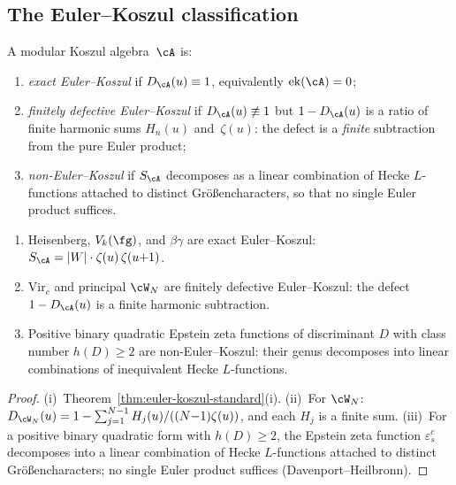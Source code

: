 \subsection{The Euler--Koszul classification}%
\label{subsec:euler-koszul-classification}%

\begin{definition}%
\label{def:euler-koszul-tier}%
%
A modular Koszul algebra~$\cA$ is:
\begin{enumerate}[label=\textup{(\roman*)}]
\item
\emph{exact Euler--Koszul} if $D_\cA(u) \equiv 1$, equivalently
$\operatorname{ek}(\cA) = 0$;
\item
\emph{finitely defective Euler--Koszul} if
$D_\cA(u) \not\equiv 1$ but $1 - D_\cA(u)$
is a ratio of finite harmonic sums $H_n(u)$ and~$\zeta(u)$:
the defect is a \emph{finite} subtraction from the
pure Euler product;
\item
\emph{non-Euler--Koszul} if $S_\cA$ decomposes as a linear
combination of Hecke $L$-functions attached to distinct
Gr\"o\ss encharacters, so that no single Euler product
suffices.
\end{enumerate}
\end{definition}

\begin{theorem}%
\label{thm:euler-koszul-tier-classification}%
%
\begin{enumerate}[label=\textup{(\roman*)}]
\item
Heisenberg, $V_k(\fg)$, and $\beta\gamma$ are exact
Euler--Koszul: $S_\cA = |W|\cdot\zeta(u)\,\zeta(u{+}1)$.
\item
$\mathrm{Vir}_c$ and principal $\cW_N$ are finitely defective
Euler--Koszul: the defect
$1 - D_\cA(u)$ is a finite harmonic subtraction.
\item
Positive binary quadratic Epstein zeta functions of discriminant
$D$ with class number $h(D) \geq 2$ are non-Euler--Koszul: their
genus decomposes into linear combinations of inequivalent Hecke
$L$-functions.
\end{enumerate}
\end{theorem}

\begin{proof}
(i)~Theorem~\ref{thm:euler-koszul-standard}(i).
(ii)~For $\cW_N$: $D_{\cW_N}(u) = 1 -
\sum_{j=1}^{N-1}H_j(u)/((N{-}1)\zeta(u))$, and
each $H_j$ is a finite sum.
(iii)~For a positive binary quadratic form with $h(D) \geq 2$, the
Epstein zeta function
$\varepsilon^c_s$
decomposes into a linear combination of Hecke
$L$-functions attached to distinct Gr\"o\ss encharacters;
no single Euler product suffices
(Davenport--Heilbronn).
\end{proof}

